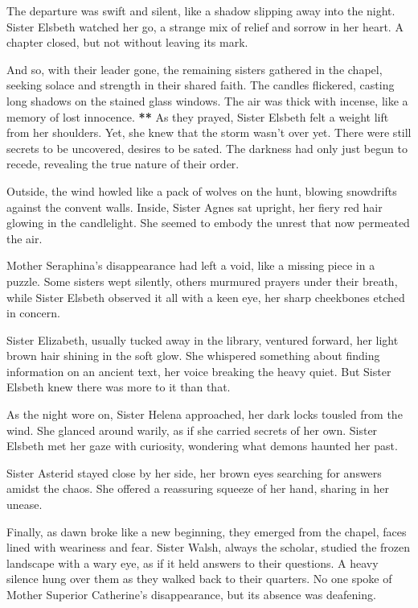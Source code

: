 \documentclass[11pt]{article}
\begin{document}
The departure was swift and silent, like a shadow slipping away into the night. Sister Elsbeth watched her go, a strange mix of relief and sorrow in her heart. A chapter closed, but not without leaving its mark.

And so, with their leader gone, the remaining sisters gathered in the chapel, seeking solace and strength in their shared faith. The candles flickered, casting long shadows on the stained glass windows. The air was thick with incense, like a memory of lost innocence.
\textbf{\textbf{\textbf{**}}}
As they prayed, Sister Elsbeth felt a weight lift from her shoulders. Yet, she knew that the storm wasn't over yet. There were still secrets to be uncovered, desires to be sated. The darkness had only just begun to recede, revealing the true nature of their order.

Outside, the wind howled like a pack of wolves on the hunt, blowing snowdrifts against the convent walls. Inside, Sister Agnes sat upright, her fiery red hair glowing in the candlelight. She seemed to embody the unrest that now permeated the air.

Mother Seraphina's disappearance had left a void, like a missing piece in a puzzle. Some sisters wept silently, others murmured prayers under their breath, while Sister Elsbeth observed it all with a keen eye, her sharp cheekbones etched in concern.

Sister Elizabeth, usually tucked away in the library, ventured forward, her light brown hair shining in the soft glow. She whispered something about finding information on an ancient text, her voice breaking the heavy quiet. But Sister Elsbeth knew there was more to it than that.

As the night wore on, Sister Helena approached, her dark locks tousled from the wind. She glanced around warily, as if she carried secrets of her own. Sister Elsbeth met her gaze with curiosity, wondering what demons haunted her past.

Sister Asterid stayed close by her side, her brown eyes searching for answers amidst the chaos. She offered a reassuring squeeze of her hand, sharing in her unease.

Finally, as dawn broke like a new beginning, they emerged from the chapel, faces lined with weariness and fear. Sister Walsh, always the scholar, studied the frozen landscape with a wary eye, as if  it held answers to their questions. A heavy silence hung over them as they walked back to their quarters. No one spoke of Mother Superior Catherine's disappearance, but its absence was deafening.
\end{document}
